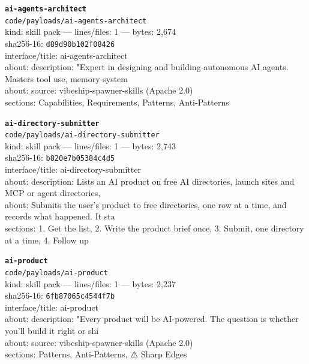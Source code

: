 \noindent\textbf{\texttt{ai-agents-architect}}\\
\texttt{code/payloads/ai-agents-architect}\\
kind: skill pack --- lines/files: 1 --- bytes: 2,674\\
sha256-16: \texttt{d89d90b102f08426}\\
interface/title: ai-agents-architect\\
about: description: "Expert in designing and building autonomous AI agents. Masters tool use, memory system\\
about: source: vibeship-spawner-skills (Apache 2.0)\\
sections: Capabilities, Requirements, Patterns, Anti-Patterns\\
\vspace*{6.0pt}

\noindent\textbf{\texttt{ai-directory-submitter}}\\
\texttt{code/payloads/ai-directory-submitter}\\
kind: skill pack --- lines/files: 1 --- bytes: 2,743\\
sha256-16: \texttt{b820e7b05384c4d5}\\
interface/title: ai-directory-submitter\\
about: description: Lists an AI product on free AI directories, launch sites and MCP or agent directories, \\
about: Submits the user's product to free directories, one row at a time, and records what happened. It sta\\
sections: 1. Get the list, 2. Write the product brief once, 3. Submit, one directory at a time, 4. Follow up\\
\vspace*{6.0pt}
\newpage

\noindent\textbf{\texttt{ai-product}}\\
\texttt{code/payloads/ai-product}\\
kind: skill pack --- lines/files: 1 --- bytes: 2,237\\
sha256-16: \texttt{6fb87065c4544f7b}\\
interface/title: ai-product\\
about: description: "Every product will be AI-powered. The question is whether you'll build it right or shi\\
about: source: vibeship-spawner-skills (Apache 2.0)\\
sections: Patterns, Anti-Patterns, ⚠️ Sharp Edges\\
\vspace*{6.0pt}

